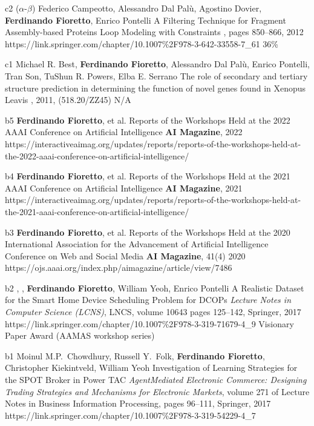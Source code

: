 \begin{pubs}
	\confentry 
		{c2} %
		{($\alpha$-$\beta$) 
		Federico Campeotto, Alessandro Dal Pal\`{u}, Agostino Dovier, {\bf Ferdinando Fioretto}, Enrico Pontelli}
		{A Filtering Technique for Fragment Assembly-based Proteins Loop Modeling with Constraints} 
		{\procCP, pages 850--866, 2012}
		{https://link.springer.com/chapter/10.1007\%2F978-3-642-33558-7\_61}
		{36\%}

	\confentry
		{c1} %
		{Michael R. Best, {\bf Ferdinando Fioretto}, Alessandro Dal Pal\`{u}, Enrico Pontelli, Tran Son, TuShun R. Powers, Elba E. Serrano}
		{The role of secondary and tertiary structure prediction in determining the function of novel genes found in Xenopus Leavis}
		{, 2011, (518.20/ZZ45)}{}
		{N/A}
\end{pubs}

\begin{pubs}
\journalentry
	{b5} %
	{{\bf Ferdinando Fioretto}, et al.} 
	{Reports of the Workshops Held at the 2022 AAAI Conference on Artificial Intelligence}
	{{\bf AI Magazine}, 2022}
	{https://interactiveaimag.org/updates/reports/reports-of-the-workshops-held-at-the-2022-aaai-conference-on-artificial-intelligence/}

\journalentry
	{b4} %
	{{\bf Ferdinando Fioretto}, et al.} 
	{Reports of the Workshops Held at the 2021 AAAI Conference on Artificial Intelligence}
	{{\bf AI Magazine}, 2021}
	{https://interactiveaimag.org/updates/reports/reports-of-the-workshops-held-at-the-2021-aaai-conference-on-artificial-intelligence/}

\journalentry
	{b3} %
	{{\bf Ferdinando Fioretto}, et al.} 
	{Reports of the Workshops Held at the 2020 International Association for the Advancement of Artificial Intelligence Conference on Web and Social Media}
	{{\bf AI Magazine},  41(4) 2020}
	{https://ojs.aaai.org/index.php/aimagazine/article/view/7486}

\journalentryAwd
	{b2} %
	{, , {\bf Ferdinando Fioretto}, William Yeoh, Enrico Pontelli}
	{A Realistic Dataset for the Smart Home Device Scheduling Problem for DCOPs}
	{\emph{Lecture Notes in Computer Science (LCNS)}, LNCS, volume 10643 pages 125--142, Springer, 2017}
	{https://link.springer.com/chapter/10.1007\%2F978-3-319-71679-4\_9}
	{Visionary Paper Award}
	{(AAMAS workshop series)}

\journalentry
	{b1} %
	{Moinul M.P.~Chowdhury, Russell Y.~Folk, {\bf Ferdinando Fioretto}, Christopher Kiekintveld, William Yeoh}
	{Investigation of Learning Strategies for the SPOT Broker in Power TAC}
	{\emph{AgentMediated Electronic Commerce: Designing Trading Strategies and Mechanisms for Electronic Markets}, volume 271 of Lecture Notes in Business Information Processing, 
	    pages 96–111, Springer, 2017}
    {https://link.springer.com/chapter/10.1007\%2F978-3-319-54229-4\_7}
\end{pubs}


